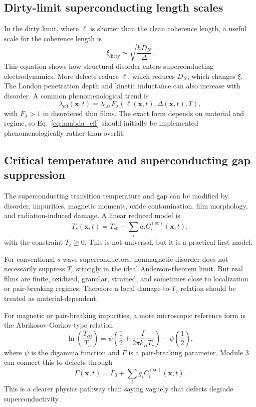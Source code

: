 \documentclass[11pt]{article}
\newcommand{\x}{\mathbf{x}}
\begin{document}
\subsection{Dirty-limit superconducting length scales}

In the dirty limit, where $\ell$ is shorter than the clean coherence length, a useful scale for the coherence length is
\begin{equation}
\xi_{\mathrm{dirty}}\sim \sqrt{\frac{\hbar D_N}{\Delta}}.
\label{eq:dirty_xi}
\end{equation}
This equation shows how structural disorder enters superconducting electrodynamics. More defects reduce $\ell$, which reduces $D_N$, which changes $\xi$. The London penetration depth and kinetic inductance can also increase with disorder. A common phenomenological trend is
\begin{equation}
\lambda_{\mathrm{eff}}(\x,t)=\lambda_{\mathrm{L0}}\,F_{\lambda}(\ell(\x,t),\Delta(\x,t),T),
\label{eq:lambda_eff}
\end{equation}
with $F_{\lambda}>1$ in disordered thin films. The exact form depends on material and regime, so Eq.~\eqref{eq:lambda_eff} should initially be implemented phenomenologically rather than overfit.

\subsection{Critical temperature and superconducting gap suppression}

The superconducting transition temperature and gap can be modified by disorder, impurities, magnetic moments, oxide contamination, film morphology, and radiation-induced damage. A linear reduced model is
\begin{equation}
T_c(\x,t)=T_{c0}-\sum_i a_i C_i^{(\mathrm{sc})}(\x,t),
\label{eq:Tc_linear_damage}
\end{equation}
with the constraint $T_c\ge 0$. This is not universal, but it is a practical first model.

For conventional $s$-wave superconductors, nonmagnetic disorder does not necessarily suppress $T_c$ strongly in the ideal Anderson-theorem limit. But real films are finite, oxidized, granular, strained, and sometimes close to localization or pair-breaking regimes. Therefore a local damage-to-$T_c$ relation should be treated as material-dependent.

For magnetic or pair-breaking impurities, a more microscopic reference form is the Abrikosov-Gorkov-type relation
\begin{equation}
\ln\left(\frac{T_{c0}}{T_c}\right)
=\psi\left(\frac{1}{2}+\frac{\Gamma}{2\pi k_B T_c}\right)-\psi\left(\frac{1}{2}\right),
\label{eq:ag}
\end{equation}
where $\psi$ is the digamma function and $\Gamma$ is a pair-breaking parameter. Module 3 can connect this to defects through
\begin{equation}
\Gamma(\x,t)=\Gamma_0+\sum_i g_i C_i^{(\mathrm{sc})}(\x,t).
\label{eq:gamma_defects}
\end{equation}
This is a clearer physics pathway than saying vaguely that defects degrade superconductivity.
\end{document}
